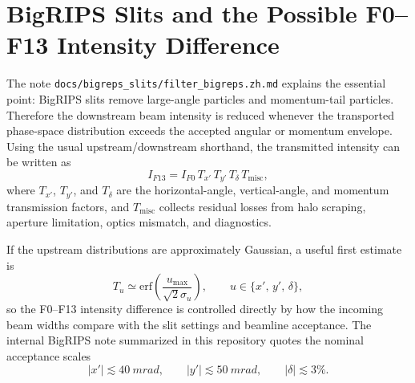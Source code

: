 \documentclass[11pt,a4paper]{article}
\begin{document}
\section{BigRIPS Slits and the Possible F0--F13 Intensity Difference}

The note \texttt{docs/bigreps\_slits/filter\_bigreps.zh.md} explains the essential point: BigRIPS slits remove large-angle particles and momentum-tail particles. Therefore the downstream beam intensity is reduced whenever the transported phase-space distribution exceeds the accepted angular or momentum envelope. Using the usual upstream/downstream shorthand, the transmitted intensity can be written as
\begin{equation}
\label{eq:f0_f13_transport}
    I_{F13} = I_{F0}\,T_{x'}\,T_{y'}\,T_{\delta}\,T_{\mathrm{misc}},
\end{equation}
where $T_{x'}$, $T_{y'}$, and $T_{\delta}$ are the horizontal-angle, vertical-angle, and momentum transmission factors, and $T_{\mathrm{misc}}$ collects residual losses from halo scraping, aperture limitation, optics mismatch, and diagnostics.

If the upstream distributions are approximately Gaussian, a useful first estimate is
\begin{equation}
\label{eq:gaussian_transmission}
    T_{u} \simeq \mathrm{erf}\!\left(\frac{u_{\max}}{\sqrt{2}\sigma_u}\right),
    \qquad
    u \in \{x',\,y',\,\delta\},
\end{equation}
so the F0--F13 intensity difference is controlled directly by how the incoming beam widths compare with the slit settings and beamline acceptance. The internal BigRIPS note summarized in this repository quotes the nominal acceptance scales
\begin{equation}
    |x'| \lesssim \SI{40}{mrad},
    \qquad
    |y'| \lesssim \SI{50}{mrad},
    \qquad
    |\delta| \lesssim 3\%.
\end{equation}
\end{document}
